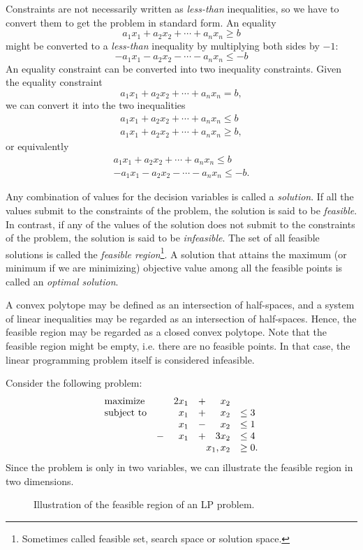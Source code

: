 Constraints are not necessarily written as
\textit{less-than} inequalities, so we have to convert them to get the problem
in standard form. An equality
\[
a_1 x_1 + a_2 x_2 + \cdots + a_n x_n \geq b
\]
might be converted to a \textit{less-than} inequality by multiplying both
sides by $-1$:
\[
- a_1 x_1 - a_2 x_2 - \cdots - a_n x_n \leq -b
\]
An equality constraint can be converted into two inequality constraints.
Given the equality constraint
\[
a_1 x_1 + a_2 x_2 + \cdots + a_n x_n = b,
\]
we can convert it into the two inequalities
\[
\begin{array}{c}
a_1 x_1 + a_2 x_2 + \cdots + a_n x_n \leq b \\
a_1 x_1 + a_2 x_2 + \cdots + a_n x_n \geq b,
\end{array}
\]
or equivalently
\[
\begin{array}{c}
a_1 x_1 + a_2 x_2 + \cdots + a_n x_n \leq b \\
- a_1 x_1 - a_2 x_2 - \cdots - a_n x_n \leq -b.
\end{array}
\]

Any combination of values for the decision variables is called a \textit{solution}.
If all the values submit to the constraints of the problem, the solution is
said to be \textit{feasible}. In contrast, if any of the values of the solution
does not submit to the constraints of the problem, the solution is said to
be \textit{infeasible}. The set of all feasible solutions is called the
\textit{feasible region}\footnote{Sometimes called feasible set,
search space or solution space.}\cite{nocedal}. A solution that attains
the maximum (or minimum if we are minimizing) objective value among all
the feasible points is called an \textit{optimal solution}.

A convex polytope may be defined as an intersection of half-spaces, and a system
of linear inequalities may be regarded as an intersection of half-spaces\cite{branko}.
Hence, the feasible region may be regarded as a closed convex polytope.
Note that the feasible region might be empty, i.e. there are no feasible points.
In that case, the linear programming problem itself is considered infeasible.

Consider the following problem:
\[
\begin{array}{lcrcrl}
    \textrm{maximize}   & & 2 x_1 &+&   x_2 \\
    \textrm{subject to} & &   x_1 &+&   x_2 & \leq 3 \\
                        & &   x_1 &-&   x_2 & \leq 1 \\
                        &-&   x_1 &+& 3 x_2 & \leq 4 \\
     \multicolumn{5}{r}{x_1,x_2}            & \geq 0.
\end{array}
\]
Since the problem is only in two variables, we can illustrate the feasible region
in two dimensions.

\begin{figure}[ht!]
\centering

\caption{Illustration of the feasible region of an LP problem.}
\end{figure}
